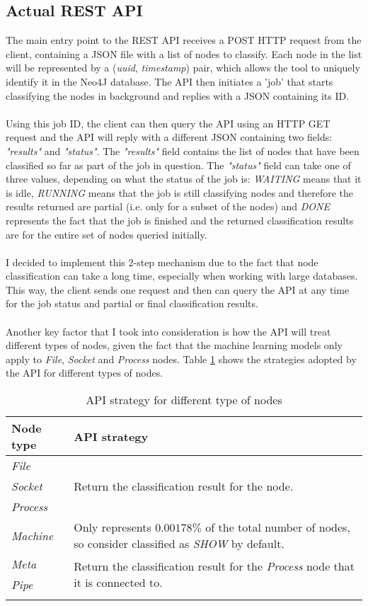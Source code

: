 	\subsection{Actual REST API} \label{Section: impl/REST/actual}
	The main entry point to the REST API receives a POST HTTP request from the client, containing a JSON file with a list of nodes to classify. Each node in the list will be represented by a (\textit{uuid}, \textit{timestamp}) pair, which allows the tool to uniquely identify it in the Neo4J database. The API then initiates a 'job' that starts classifying the nodes in background and replies with a JSON containing its ID.
	\\ \\
	Using this job ID, the client can then query the API using an HTTP GET request and the API will reply with a different JSON containing two fields: \textit{"results"} and \textit{"status"}. The \textit{"results"} field contains the list of nodes that have been classified so far as part of the job in question. The \textit{"status"} field can take one of three values, depending on what the status of the job is: \textit{WAITING} means that it is idle, \textit{RUNNING} means that the job is still classifying nodes and therefore the results returned are partial (i.e. only for a subset of the nodes) and \textit{DONE} represents the fact that the job is finished and the returned classification results are for the entire set of nodes queried initially. 
	\\ \\
	I decided to implement this 2-step mechanism due to the fact that node classification can take a long time, especially when working with large databases. This way, the client sends one request and then can query the API at any time for the job status and partial or final classification results.
	\\ \\
	Another key factor that I took into consideration is how the API will treat different types of nodes, given the fact that the machine learning models only apply to \textit{File}, \textit{Socket} and \textit{Process} nodes. Table \ref{Table: impl/REST/API-strategy} shows the strategies adopted by the API for different types of nodes.
	\begin{longtable}{|p{}|p{}|}
		\textbf{Node type} & \textbf{API strategy} \\
		\hline
		\textit{File} & \multirow{3}{*}{Return the classification result for the node.} \\
		\textit{Socket} & \\
		\textit{Process} & \\
		\hline
		\textit{Machine} & Only represents $0.00178\%$ of the total number of nodes, so consider classified as \textit{SHOW} by default. \\
		\hline
		\textit{Meta} & \multirow{2}{*}{Return the classification result for the \textit{Process} node that it is connected to.} \\
		\textit{Pipe} & \\
		\hline
		\caption{API strategy for different type of nodes}
		\label{Table: impl/REST/API-strategy}
 	\end{longtable}
 
